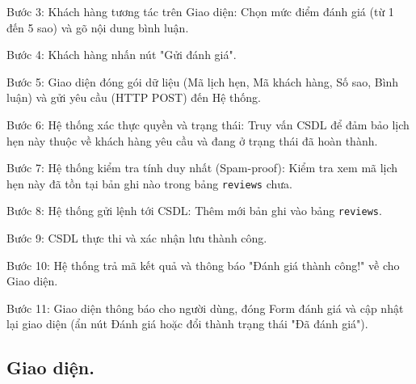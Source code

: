 \documentclass[../BTL.tex]{subfiles}
\begin{document}
Bước 3: Khách hàng tương tác trên Giao diện: Chọn mức điểm đánh giá (từ 1 đến 5 sao) và gõ nội dung bình luận.

Bước 4: Khách hàng nhấn nút "Gửi đánh giá".

Bước 5: Giao diện đóng gói dữ liệu (Mã lịch hẹn, Mã khách hàng, Số sao, Bình luận) và gửi yêu cầu (HTTP POST) đến Hệ thống.

Bước 6: Hệ thống xác thực quyền và trạng thái: Truy vấn CSDL để đảm bảo lịch hẹn này thuộc về khách hàng yêu cầu và đang ở trạng thái đã hoàn thành.

Bước 7: Hệ thống kiểm tra tính duy nhất (Spam-proof): Kiểm tra xem mã lịch hẹn này đã tồn tại bản ghi nào trong bảng \texttt{reviews} chưa.

Bước 8: Hệ thống gửi lệnh tới CSDL: Thêm mới bản ghi vào bảng \texttt{reviews}.

Bước 9: CSDL thực thi và xác nhận lưu thành công.

Bước 10: Hệ thống trả mã kết quả và thông báo "Đánh giá thành công!" về cho Giao diện.

Bước 11: Giao diện thông báo cho người dùng, đóng Form đánh giá và cập nhật lại giao diện (ẩn nút Đánh giá hoặc đổi thành trạng thái "Đã đánh giá").

\subsection{Giao diện.}
\end{document}
